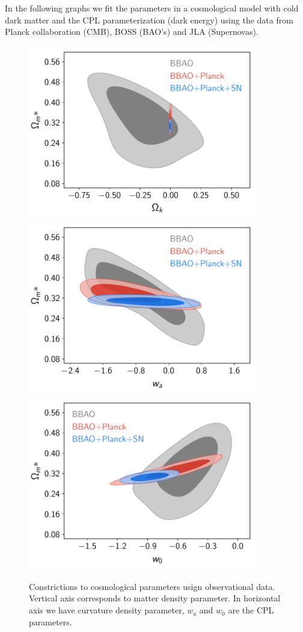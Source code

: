 \documentclass[onecolumn,           %
               showpacs,            %
               preprintnumbers,     %
               aps,                 %
               prl,          	    %
               letterpaper,             %
               superscriptaddress,      %
               nofootinbib,         %
               tightenlines,        %
               floats,floatfix      %
               ,usenatbib,
               ]{revtex4-1}
\begin{document}
In the following graphs we fit the parameters in a cosmological model with cold dark matter and the CPL parameterization (dark energy) using the data from Planck collaboration (CMB), BOSS (BAO's) and JLA (Supernovas). \\

\begin{figure}[h]
	\centering
	\includegraphics[width=10cm]{FiguresCosmo/Ok_Om_owaCDM_todos.pdf}	
	\includegraphics[width=10cm]{FiguresCosmo/wa_Om_owaCDM_todos.pdf}
	\includegraphics[width=10cm]{FiguresCosmo/w_Om_owaCDM_todos}
	\caption{Constrictions to cosmological parameters usign observational data. Vertical axis corresponds to matter density parameter. In horizontal axis we have curvature density parameter, $w_a$ and $w_0$ are the CPL parameters.}
	\label{cosmo1}
\end{figure}
\end{document}

